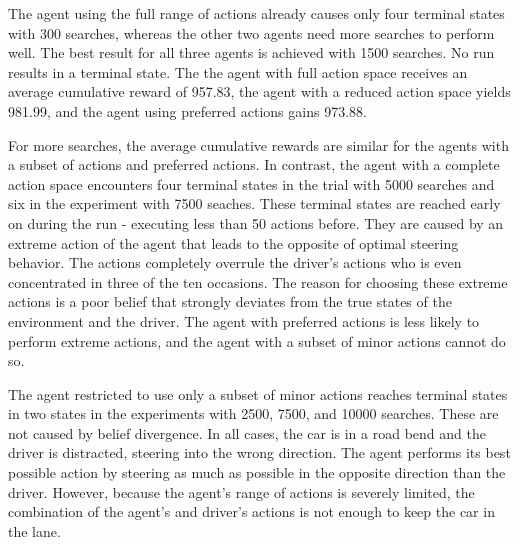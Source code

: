 

The agent using the full range of actions already causes only four terminal states with 300 searches, whereas the other two agents need more searches to perform well. The best result for all three agents is achieved with 1500 searches. No run results in a terminal state. The the agent with full action space receives an average cumulative reward of 957.83, the agent with a reduced action space yields 981.99, and the agent using preferred actions gains 973.88. 

For more searches, the average cumulative rewards are similar for the agents with a subset of actions and preferred actions. In contrast, the agent with a complete action space encounters four terminal states in the trial with 5000 searches and six in the experiment with 7500 seaches. These terminal states are reached early on during the run - executing less than 50 actions before. They are caused by an extreme action of the agent that leads to the opposite of optimal steering behavior. The actions completely overrule the driver's actions who is even concentrated in three of the ten occasions. The reason for choosing these extreme actions is a poor belief that strongly deviates from the true states of the environment and the driver. The agent with preferred actions is less likely to perform extreme actions, and the agent with a subset of minor actions cannot do so. 



The agent restricted to use only a subset of minor actions reaches terminal states in two states in the experiments with 2500, 7500, and 10000 searches. These are not caused by belief divergence. In all cases, the car is in a road bend and the driver is distracted, steering into the wrong direction. The agent performs its best possible action by steering as much as possible in the opposite direction than the driver. However, because the agent's range of actions is severely limited, the combination of the agent's and driver's actions is not enough to keep the car in the lane. 

